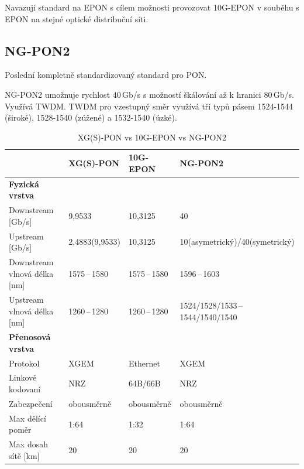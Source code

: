 Navazují standard na EPON s cílem možnosti provozovat 10G-EPON v souběhu s EPON na stejné optické distribuční síti.

\subsection{NG-PON2}
Poslední kompletně standardizovaný standard pro PON.

NG-PON2 umožnuje rychlost 40\,Gb/s s možností škálování až k hranici 80\,Gb/s. Využívá TWDM. TWDM pro vzestupný směr využívá tří typů pásem 1524-1544 (široké), 1528-1540 (zúžené) a 1532-1540 (úzké).

\begin{table}[ht]
    \centering
    \caption{XG(S)-PON vs 10G-EPON vs NG-PON2}
    \begin{tabular}{|l|l|l|l|}
        \hline
                                     & XG(S)-PON      & 10G-EPON       & NG-PON2                            \\\hline\hline
        \textbf{Fyzická vrstva}      &                &                &                                    \\\hline\hline
        Downstream [Gb/s]            & 9,9533         & 10,3125        & 40                                 \\\hline
        Upstream [Gb/s]              & 2,4883(9,9533) & 10,3125        & 10(asymetrický)/40(symetrický)     \\\hline
        Downstream vlnová délka [nm] & 1575\,--\,1580 & 1575\,--\,1580 & 1596\,--\,1603                     \\\hline
        Upstream vlnová délka [nm]   & 1260\,--\,1280 & 1260\,--\,1280 & 1524/1528/1533\,--\,1544/1540/1540 \\\hline\hline
        \textbf{Přenosová vrstva}    &                &                &                                    \\\hline\hline
        Protokol                     & XGEM           & Ethernet       & XGEM                               \\\hline
        Linkové kodovaní             & NRZ            & 64B/66B        & NRZ                                \\\hline
        Zabezpečení                  & obousměrně     & obousměrně     & obousměrně                         \\\hline
        Max dělící poměr             & 1:64           & 1:32           & 1:64                               \\\hline
        Max dosah sítě [km]          & 20             & 20             & 20                                 \\\hline
    \end{tabular}
\end{table}

